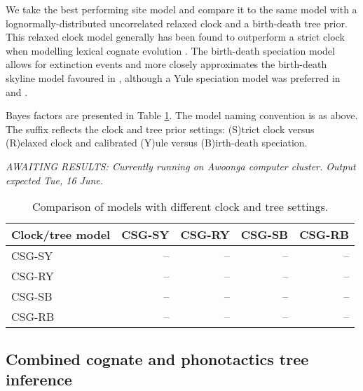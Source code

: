 We take the best performing site model and compare it to the same model with a lognormally-distributed uncorrelated relaxed clock and a birth-death tree prior. This relaxed clock model generally has been found to outperform a strict clock when modelling lexical cognate evolution \autocites{bouckaert_origin_2018}{kolipakam_bayesian_2018}. The birth-death speciation model allows for extinction events and more closely approximates the birth-death skyline model favoured in \textcite{bouckaert_origin_2018}, although a Yule speciation model was preferred in \textcite{bowern_computational_2012} and \textcite{kolipakam_bayesian_2018}.

Bayes factors are presented in Table \ref{tab:tree-models}. The model naming convention is as above. The suffix reflects the clock and tree prior settings: (S)trict clock versus (R)elaxed clock and calibrated (Y)ule versus (B)irth-death speciation.

\emph{AWAITING RESULTS: Currently running on Awoonga computer cluster. Output expected Tue, 16 June.}

\begin{table}

\caption{\label{tab:tree-models}Comparison of models with different clock and tree settings.}
\centering
\begin{tabular}[t]{lrrrr}
\toprule
Clock/tree model & CSG-SY & CSG-RY & CSG-SB & CSG-RB\\
\midrule
CSG-SY & -- & -- & -- & --\\
CSG-RY & -- & -- & -- & --\\
\addlinespace
CSG-SB & -- & -- & -- & --\\
CSG-RB & -- & -- & -- & --\\
\bottomrule
\end{tabular}
\end{table}

\hypertarget{pn-tree-combined}{%
\subsection{Combined cognate and phonotactics tree inference}\label{pn-tree-combined}}

